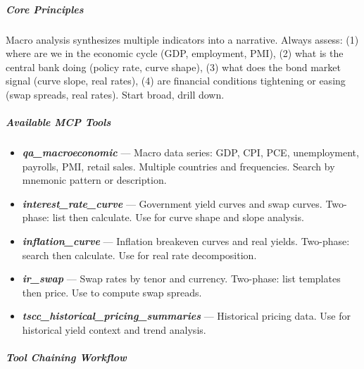 \documentclass[11pt]{article}
\begin{document}
\subparagraph{Core Principles}\mbox{}\par

Macro analysis synthesizes multiple indicators into a narrative. Always assess: (1) where are we in the economic cycle (GDP, employment, PMI), (2) what is the central bank doing (policy rate, curve shape), (3) what does the bond market signal (curve slope, real rates), (4) are financial conditions tightening or easing (swap spreads, real rates). Start broad, drill down.


\subparagraph{Available MCP Tools}\mbox{}\par

\begin{itemize}[leftmargin=*,itemsep=2pt,topsep=2pt]
\item {} \textbf{\emph{qa\_\allowbreak{}macroeconomic}} — Macro data series: GDP, CPI, PCE, unemployment, payrolls, PMI, retail sales. Multiple countries and frequencies. Search by mnemonic pattern or description.
\item {} \textbf{\emph{interest\_\allowbreak{}rate\_\allowbreak{}curve}} — Government yield curves and swap curves. Two-phase: list then calculate. Use for curve shape and slope analysis.
\item {} \textbf{\emph{inflation\_\allowbreak{}curve}} — Inflation breakeven curves and real yields. Two-phase: search then calculate. Use for real rate decomposition.
\item {} \textbf{\emph{ir\_\allowbreak{}swap}} — Swap rates by tenor and currency. Two-phase: list templates then price. Use to compute swap spreads.
\item {} \textbf{\emph{tscc\_\allowbreak{}historical\_\allowbreak{}pricing\_\allowbreak{}summaries}} — Historical pricing data. Use for historical yield context and trend analysis.
\end{itemize}

\subparagraph{Tool Chaining Workflow}\mbox{}\par
\end{document}
